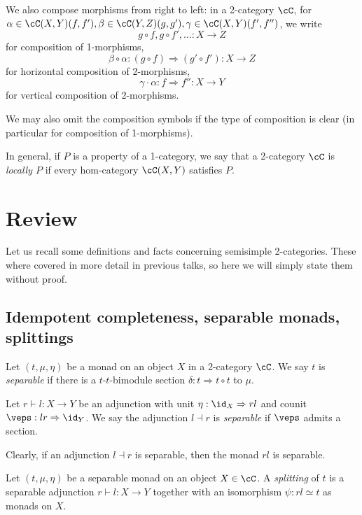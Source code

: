 \documentclass[12pt]{article}
\begin{document}
We also compose morphisms from right to left:
in a 2-category $\cC$,
for $\alpha \in \cC(X,Y)(f,f'),
\beta \in \cC(Y,Z)(g,g'),
\gamma \in \cC(X,Y)(f',f'')$,
we write
\[
g \circ f, g \circ f', \ldots : X \to Z
\]
for composition of 1-morphisms,
\[
\beta \circ \alpha: (g \circ f) \Rightarrow (g' \circ f'):
	X \to Z
\]
for horizontal composition of 2-morphisms,
\[
\gamma \cdot \alpha: f \Rightarrow f'' : X \to Y
\]
for vertical composition of 2-morphisms.


We may also omit the composition symbols
if the type of composition is clear
(in particular for composition of 1-morphisms).



In general, if $P$ is a property of a 1-category,
we say that a 2-category $\cC$ is \emph{locally $P$}
if every hom-category $\cC(X,Y)$ satisfies $P$.

\section{Review}

Let us recall some definitions and facts concerning
semisimple 2-categories.
These where covered in more detail in previous talks,
so here we will simply state them without proof.

\subsection{Idempotent completeness, separable monads, splittings}

\begin{definition}
Let $(t, \mu, \eta)$ be a monad on an object $X$
in a 2-category $\cC$.
We say $t$ is \emph{separable} if there is a
$t$-$t$-bimodule section
$\delta: t \Rightarrow t \circ t$ to $\mu$.
\end{definition}

\begin{definition}
Let $r \vdash l: X \to Y$ be an adjunction
with unit $\eta: \id_X \Rightarrow rl$
and counit $\veps: lr \Rightarrow \id_Y$.
We say the adjunction $l \dashv r$ is \emph{separable}
if $\veps$ admits a section.
\end{definition}

Clearly, if an adjunction $l \dashv r$ is separable,
then the monad $rl$ is separable.

\begin{definition}
Let $(t,\mu,\eta)$ be a separable monad on
an object $X \in \cC$.
A \emph{splitting} of $t$ is a separable adjunction
$r \vdash l: X \to Y$
together with an isomorphism
$\psi: rl \simeq t$ as monads on $X$.
\end{definition}
\end{document}
